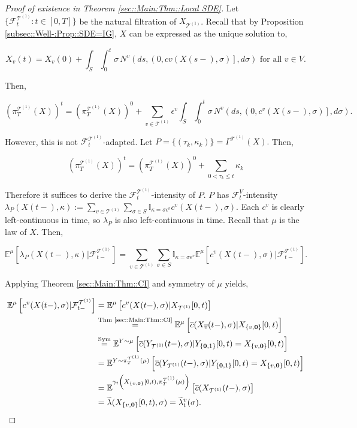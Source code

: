 \documentclass[12pt]{article}
\newcommand{\mb}{\mathbb}
\newcommand{\mc}{\mathcal}
\newcommand{\ov}{\overline}
\newcommand{\os}{\overset}
\newcommand{\te}{\text}
\newcommand{\ep}{\epsilon}
\newcommand{\exmu}[2]{\mb{E}^{#1}\left[#2\right]}	%
\renewcommand{\root}{\mathbf{0}}				%
\renewcommand{\v}{v}							%
\renewcommand{\S}{S}							%
\newcommand{\s}{\sigma}							%
\newcommand{\ev}{\ep}							%
\newcommand{\T}{T}								%
\renewcommand{\t}{t}							%
\newcommand{\proj}{\pi}							%
\renewcommand{\tt}{s}							%
\newcommand{\F}{\mc{F}}							%
\newcommand{\X}{X}								%
\newcommand{\IGr}{c}							%
\newcommand{\vind}[1]{^{#1}}					%
\newcommand{\vsi}[1]{^{#1}}						%
\newcommand{\cind}[1]{_{#1}}					%
\newcommand{\cl}{\ov}							%
\newcommand{\tp}[1]{(#1)}						%
\newcommand{\tip}[1]{#1}						%
\newcommand{\ts}[1]{_{#1}}						%
\newcommand{\IGrg}{\ov{c}}						%
\newcommand{\tree}{\mc{T}}						%
\newcommand{\sln}[1]{^{(#1)}}					%
\newcommand{\poiss}{N}							%
\newcommand{\rate}{\lambda}						%
\newcommand{\alt}[1]{\widetilde{#1}}			%
\newcommand{\pra}[1]{_{#1}}						%
\newcommand{\indx}[1]{_{#1}}					%
\newcommand{\m}{\mu}							%
\newcommand{\cm}{\gamma}						%
\newcommand{\XX}{Y}								%
\newcommand{\rt}{\tau}							%
\renewcommand{\it}{k}							%
\newcommand{\pmap}{\Gamma}						%
\renewcommand{\mark}{\kappa}					%
\newcommand{\rp}{P}								%
\newcommand{\crate}{\alt{\lambda}}				%
\begin{document}
\begin{proof}[Proof of existence in Theorem \ref{sec::Main:Thm::Local SDE}]

Let \(\{\F\vsi{\tree\sln{1}}\ts{\t}:\t\in [0,\T]\}\) be the natural filtration of \(\X\cind{\tree\sln{1}}\). Recall that by Proposition \ref{subsec::Well-:Prop::SDE=IG}, \(\X\) can be expressed as the unique solution to,

\[\X\cind{\v}\tp{\t} = \X\cind{\v}\tp{0} + \int_\S\int_0^\t \s\,\poiss\vind{\v}\left(d\tt,\left(0,c{\v}(\X\tp{\tt-},\s)\right],d\s\right) \te{ for all } \v \in V.\]

Then,

\[\left(\proj\vsi{\tree\sln{1}}\ts{\T}(\X)\right)^\t = \left(\proj\vsi{\tree\sln{1}}\ts{\T}(\X)\right)^0 + \sum_{\v \in \tree\sln{1}}\ev\vind{\v}\int_\S\int_0^\t \s\,\poiss\vind{\v}\left(d\tt,\left(0,\IGr\vind{\v}(\X\tp{\tt-},\s)\right],d\s\right).\]

However, this is not \(\F\vsi{\tree\sln{1}}\ts{\t}\)-adapted. Let \(\rp = \{(\rt\indx{\it},\mark\indx{\it})\} = \pmap\vind{\tree\sln{1}}(\X).\) Then,

\[\left(\proj\vsi{\tree\sln{1}}\ts{\T}(\X)\right)^\t = \left(\proj\vsi{\tree\sln{1}}\ts{\T}(\X)\right)^0 + \sum_{0 < \rt\indx{\it} \leq \t}\mark\indx{\it}\]

Therefore it suffices to derive the \(\F\vsi{\tree\sln{1}}\ts{\t}\)-intensity of \(\rp\). \(\rp\) has \(\F\vsi{V}\ts{\t}\)-intensity \(\rate\pra{\rp}(\X\tp{\t-},\mark) := \sum_{\v \in \tree\sln{1}}\sum_{\s\in \S}\mb{I}_{\mark = \s\ev\vind{\v}}\IGr\vind{\v}(\X\tp{\t-},\s)\). Each \(\IGr\vind{\v}\) is clearly left-continuous in time, so \(\rate\pra{\rp}\) is also left-continuous in time. Recall that \(\m\) is the law of \(\X\). Then,

\[\exmu{\m}{\rate\pra{\rp}(\X\tp{\t-},\mark)|\F\vsi{\tree\sln{1}}\ts{\t-}} = \sum_{\v \in \tree\sln{1}}\sum_{\s\in \S} \mb{I}_{\mark = \s\ev\vind{\v}}\exmu{\m}{\IGr\vind{\v}(\X\tp{\t-},\s)|\F\vsi{\tree\sln{1}}\ts{\t-}}.\]

Applying Theorem \ref{sec::Main:Thm::CI} and symmetry of \(\m\) yields,

\begin{align*}
\exmu{\m}{\IGr\vind{\v}(\X\tp{\t-},\s)|\F\vsi{\tree\sln{1}}\ts{\t-}} &= \exmu{\m}{\IGr\vind{\v}(\X\tp{\t-},\s)|\X\cind{\tree\sln{1}}\tip{[0,\t)}}\\
&\os{\te{Thm \ref{sec::Main:Thm::CI}}}{=} \exmu{\m}{\IGrg(\X\cind{\cl{\v}}\tp{\t-},\s)|\X\cind{\{\v,\root\}}\tip{[0,\t)}} \\
&\os{\te{Sym}}{=} \exmu{\XX\sim \m}{\IGrg(\XX\cind{\tree\sln{1}}\tp{\t-},\s)|\XX\cind{\{\root,1\}}\tip{[0,\t)} = \X\cind{\{\v,\root\}}\tip{[0,\t)}}\\
&= \exmu{\XX\sim \proj\vsi{\tree\sln{1}}\ts{\T}(\m)}{\IGrg(\XX\cind{\tree\sln{1}}\tp{\t-},\s)|\XX\cind{\{\root,1\}}\tip{[0,\t)} = \X\cind{\{\v,\root\}}\tip{[0,\t)}}\\
&= \exmu{\cm\ts{\t}\left(\X\cind{\{\v,\root\}}\tip{[0,\t)},\proj\vsi{\tree\sln{1}}\ts{\T}(\m)\right)}{\IGrg(\X\cind{\tree\sln{1}}\tp{\t-},\s)}\\
&=\crate(\X\cind{\{\v,\root\}}\tip{[0,\t)},\s) = \crate\vind{\v}\ts{\t}(\s).
\end{align*}


\end{proof}
\end{document}
